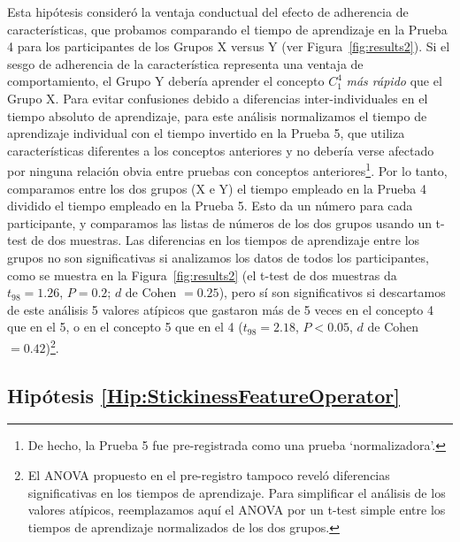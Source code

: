 Esta hipótesis consideró la ventaja conductual del efecto de adherencia de características, que probamos comparando el tiempo de aprendizaje en la Prueba 4 para los participantes de los Grupos X versus Y (ver Figura~\ref{fig:results2}). Si el sesgo de adherencia de la característica representa una ventaja de comportamiento, el Grupo Y debería aprender el concepto $ C^4_1 $ \emph{más rápido} que el Grupo X. Para evitar confusiones debido a diferencias inter-individuales en el tiempo absoluto de aprendizaje, para este análisis normalizamos el tiempo de aprendizaje individual con el tiempo invertido en la Prueba 5, que utiliza características diferentes a los conceptos anteriores y no debería verse afectado por ninguna relación obvia entre pruebas con conceptos anteriores\footnote{De hecho, la Prueba 5 fue pre-registrada como una prueba `normalizadora'.}. Por lo tanto, comparamos entre los dos grupos (X e Y) el tiempo empleado en la Prueba 4 dividido el tiempo empleado en la Prueba 5. Esto da un número para cada participante, y comparamos las listas de números de los dos grupos usando un t-test de dos muestras. Las diferencias en los tiempos de aprendizaje entre los grupos no son significativas si analizamos los datos de todos los participantes, como se muestra en la Figura~\ref{fig:results2} (el t-test de dos muestras da $ t_{98} = 1.26 $, $ P = 0.2 $; $d$ de Cohen $= 0.25 $), pero sí son significativos si descartamos de este análisis 5 valores atípicos que gastaron más de 5 veces en el concepto 4 que en el 5, o en el concepto 5 que en el 4 ($ t_{98} = 2.18 $, $ P <0.05 $, $ d$ de Cohen $= 0.42 $)\footnote{El ANOVA propuesto en el pre-registro tampoco reveló diferencias significativas en los tiempos de aprendizaje. Para simplificar el análisis de los valores atípicos, reemplazamos aquí el ANOVA por un t-test simple entre los tiempos de aprendizaje normalizados de los dos grupos.}.



\subsection{Hipótesis \ref{Hip:StickinessFeatureOperator}} \label{Results:StickinessFeatureOperator} 

